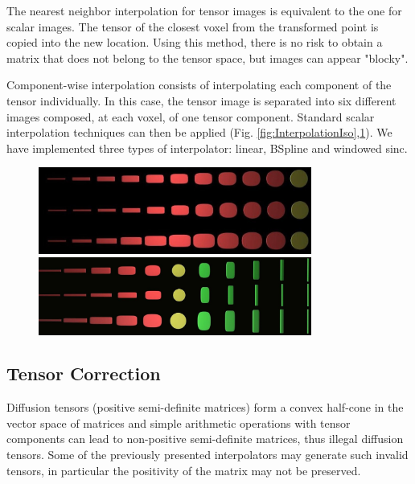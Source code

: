 \documentclass{InsightArticle}
\begin{document}
The nearest neighbor interpolation for tensor images is equivalent to the one for scalar images. The tensor of the closest voxel from the transformed point is copied into the new location. Using this method, there is no risk to obtain a matrix that does not belong to the tensor space, but images can appear "blocky".

Component-wise interpolation consists of interpolating each component of the tensor individually. In this case, the tensor image is separated into six different images composed, at each voxel, of one tensor component. Standard scalar interpolation techniques can then be applied (Fig. \ref{fig:InterpolationIso},\ref{fig:InterpolationProlate}). We have implemented three types of interpolator: linear, BSpline and windowed sinc.

\begin{figure}
\center
\includegraphics[width=0.8\textwidth]{2tensorsPhantom2-iso(linear-bs-ws).jpg}
\label{fig:InterpolationIso}
\includegraphics[width=0.8\textwidth]{2tensorsPhantom2(linear-bs-ws).jpg}
\label{fig:InterpolationProlate}
\end{figure}

\subsection{Tensor Correction}
Diffusion tensors (positive semi-definite matrices) form a convex half-cone in the vector space of matrices and simple arithmetic operations with tensor components can lead to non-positive semi-definite matrices, thus illegal diffusion tensors.
Some of the previously presented interpolators may generate such invalid tensors, in particular the positivity of the matrix may not be preserved.
\end{document}
